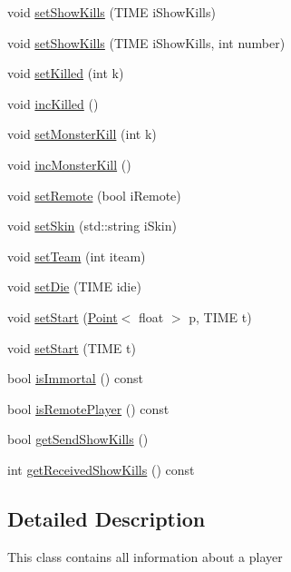 \begin{DoxyCompactItemize}
\item 
void \hyperlink{class_player_a557158a867fd435099818246c467771e}{set\-Show\-Kills} (T\-I\-M\-E i\-Show\-Kills)
\item 
void \hyperlink{class_player_ab661c93ec708508b3d63207de3ceb007}{set\-Show\-Kills} (T\-I\-M\-E i\-Show\-Kills, int number)
\item 
void \hyperlink{class_player_a80c1d3984b93a61e7d6e4e8d1db1cc0e}{set\-Killed} (int k)
\item 
void \hyperlink{class_player_a2e22e37e13a43cb7253802b8ac99a159}{inc\-Killed} ()
\item 
void \hyperlink{class_player_ac99bd37b81f07de6ad6268217dc28b42}{set\-Monster\-Kill} (int k)
\item 
void \hyperlink{class_player_aa6fb55ce0e5f324a0d21a67b4f64e287}{inc\-Monster\-Kill} ()
\item 
void \hyperlink{class_player_a0056f65dd63470c8a676c3d0417fbe9f}{set\-Remote} (bool i\-Remote)
\item 
void \hyperlink{class_player_a6022b2097c1330fc70f19745210ddf39}{set\-Skin} (std\-::string i\-Skin)
\item 
void \hyperlink{class_player_a4cfd169b16a49c4323de4ed14f4ea910}{set\-Team} (int iteam)
\item 
void \hyperlink{class_player_afd8af484ccdcec04bd881df1e572be39}{set\-Die} (T\-I\-M\-E idie)
\item 
void \hyperlink{class_player_a2dd87cb4c6d9fec37b12ed005b143260}{set\-Start} (\hyperlink{class_point}{Point}$<$ float $>$ p, T\-I\-M\-E t)
\item 
void \hyperlink{class_player_a99088f2db619e4534f610a68c381bd54}{set\-Start} (T\-I\-M\-E t)
\item 
bool \hyperlink{class_player_a948d84f95ca15f0cba6f868f17429174}{is\-Immortal} () const 
\item 
bool \hyperlink{class_player_a58f1e0d5e4a5788824e416c492f41563}{is\-Remote\-Player} () const 
\item 
bool \hyperlink{class_player_a6b9b7eb45cf04d35dc0e930882a1e229}{get\-Send\-Show\-Kills} ()
\item 
int \hyperlink{class_player_a201ff389388118fb8e2dcb2aac14424e}{get\-Received\-Show\-Kills} () const 
\end{DoxyCompactItemize}


\subsection{Detailed Description}
This class contains all information about a player 

